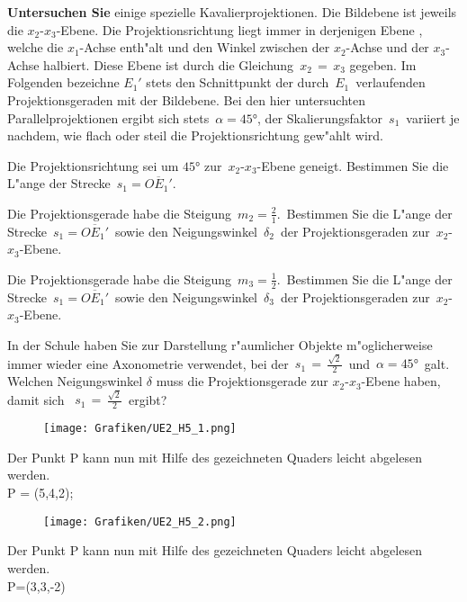 \begin{Aufgabe}
\label{Analyse_KavProj}%
\textbf{Untersuchen Sie} einige spezielle Kavalierprojektionen. Die Bildebene ist jeweils die $x_2$-$x_3$-Ebene. Die Projektionsrichtung liegt immer in derjenigen Ebene , welche die $x_1$-Achse enth"alt und den Winkel zwischen der $x_2$-Achse und der $x_3$-Achse halbiert. Diese Ebene ist durch die Gleichung \,$x_2\,=\,x_3$ gegeben. Im Folgenden bezeichne $E_1'$ stets den Schnittpunkt der durch \,$E_1$\, verlaufenden Projektionsgeraden mit der Bildebene. Bei den hier untersuchten Parallelprojektionen ergibt sich stets \,$\alpha = \ang{45}$, der Skalierungsfaktor \,$s_1$\, variiert je nachdem, wie flach oder steil die Projektionsrichtung gew"ahlt wird.
\begin{Teilaufgaben}
\item Die Projektionsrichtung sei um $\ang{45}$ zur \,$x_2$-$x_3$-Ebene geneigt. Bestimmen Sie die L"ange der Strecke \,$s_1= \overline{OE_1'}$.
\item Die Projektionsgerade habe die Steigung \,$m_2 = \frac{2}{1}$.\, Bestimmen Sie die L"ange der Strecke \,$s_1=\overline{OE_1'}$\, sowie den Neigungswinkel \,$\delta_2$\, der Projektionsgeraden zur \,$x_2$-$x_3$-Ebene.
\item Die Projektionsgerade habe die Steigung \,$m_3 = \frac{1}{2}$.\, Bestimmen Sie die L"ange der Strecke \,$s_1=\overline{OE_1'}$\, sowie den Neigungswinkel \,$\delta_3$\, der Projektionsgeraden zur \,$x_2$-$x_3$-Ebene.
\item In der Schule haben Sie zur Darstellung  r"aumlicher Objekte m"oglicherweise immer wieder eine Axonometrie verwendet, bei der \,$s_1\,=\,\tfrac{\sqrt{2}}{2}$\, und \,$\alpha = \ang{45}$\, galt. Welchen Neigungswinkel $\delta$ muss die Projektionsgerade zur $x_2$-$x_3$-Ebene haben, damit sich \, $s_1\,=\,\tfrac{\sqrt{2}}{2}$\, ergibt?
\end{Teilaufgaben}
\end{Aufgabe}
%
\begin{Loesung}
	\begin{figure}[H]
		\centering
		\texttt{[image: Grafiken/UE2\_H5\_1.png]}
		\label{fig.H5_1}
	\end{figure}
Der Punkt P kann nun mit Hilfe des gezeichneten Quaders leicht abgelesen werden.\\
P = (5,4,2);\\
\pagebreak

\begin{figure}[H]
		\centering
		\texttt{[image: Grafiken/UE2\_H5\_2.png]}
		\label{fig.H5_2}
	\end{figure}
Der Punkt P kann nun mit Hilfe des gezeichneten Quaders leicht abgelesen werden.\\
P=(3,3,-2)
\end{Loesung}
